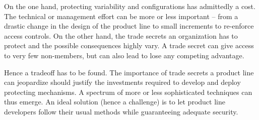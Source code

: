 
 On the one hand, protecting variability and configurations has admittedly a cost. 
The technical or management effort can be more or less important -- from a drastic change in the design of the product line to small increments to re-enforce access controls. 
On the other hand, the trade secrets an organization has to protect and the possible consequences highly vary. A trade secret can give access to very few non-members, but can also lead to lose any competing advantage. 

Hence a tradeoff has to be found. The importance of trade secrets a product line can jeopardize should justify the investments required to develop and deploy protecting mechanisms. A spectrum of more or less sophisticated techniques can thus emerge. 
 An ideal solution (hence a challenge) is to let product line developers follow their usual methods while guaranteeing adequate security. %
 




